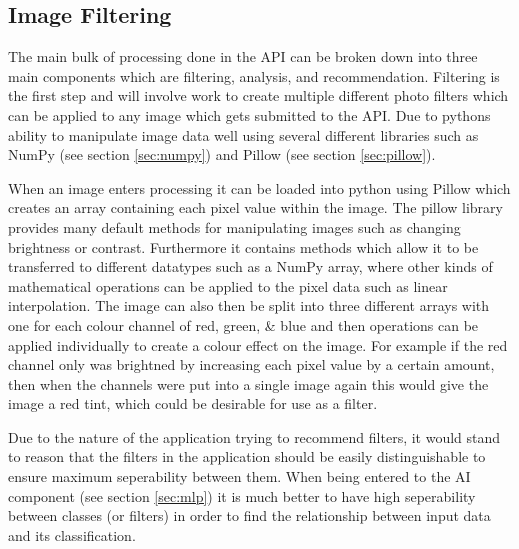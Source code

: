 \documentclass[a4paper,12pt]{report}
\begin{document}
      \subsection{Image Filtering}
        The main bulk of processing done in the API can be broken down into three main components which are filtering, analysis, and recommendation. Filtering is the first step and will involve work to create multiple different photo filters which can be applied to any image which gets submitted to the API. Due to pythons ability to manipulate image data well using several different libraries such as NumPy (see section \ref{sec:numpy}) and Pillow (see section \ref{sec:pillow}).

        When an image enters processing it can be loaded into python using Pillow which creates an array containing each pixel value within the image. The pillow library provides many default methods for manipulating images such as changing brightness or contrast. Furthermore it contains methods which allow it to be transferred to different datatypes such as a NumPy array, where other kinds of mathematical operations can be applied to the pixel data such as linear interpolation. The image can also then be split into three different arrays with one for each colour channel of red, green, \& blue and then operations can be applied individually to create a colour effect on the image. For example if the red channel only was brightned by increasing each pixel value by a certain amount, then when the channels were put into a single image again this would give the image a red tint, which could be desirable for use as a filter.

        Due to the nature of the application trying to recommend filters, it would stand to reason that the filters in the application should be easily distinguishable to ensure maximum seperability between them. When being entered to the AI component (see section \ref{sec:mlp}) it is much better to have high seperability between classes (or filters) in order to find the relationship between input data and its classification.
\end{document}
